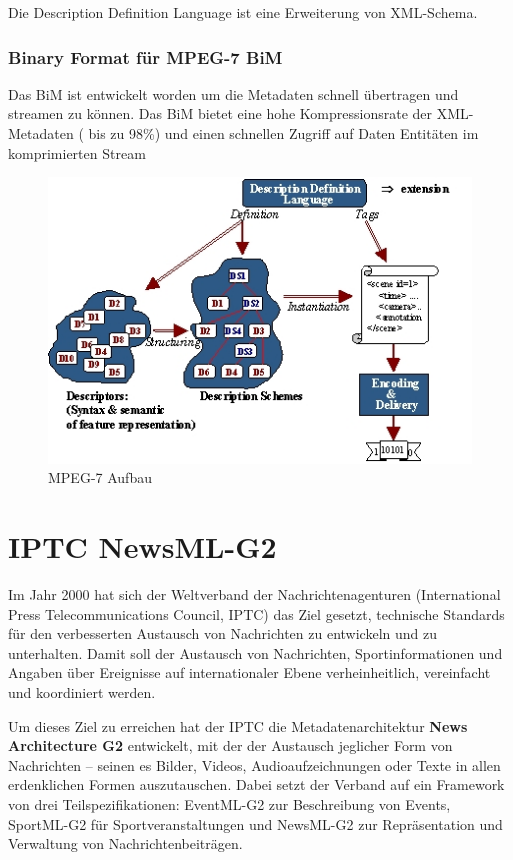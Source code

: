 	Die Description Definition Language ist eine Erweiterung von XML-Schema.

\subsubsection{Binary Format für MPEG-7 BiM}

Das BiM ist entwickelt worden um die Metadaten schnell übertragen und streamen zu können. Das BiM bietet eine hohe Kompressionsrate der XML-Metadaten ( bis zu 98\%) und einen schnellen Zugriff auf Daten Entitäten im komprimierten Stream

\begin{figure}[h]
	\includegraphics [scale=0.55]{image004.jpg}
	\caption {MPEG-7 Aufbau}
\end{figure}

	\section{IPTC NewsML-G2}
	
	Im Jahr 2000 hat sich der Weltverband der Nachrichtenagenturen (International Press Telecommunications Council, IPTC) das Ziel gesetzt, technische Standards für den verbesserten Austausch von Nachrichten zu entwickeln und zu unterhalten. Damit soll der Austausch von Nachrichten, Sportinformationen und Angaben über Ereignisse auf internationaler Ebene verheinheitlich, vereinfacht und koordiniert werden.
	
	Um dieses Ziel zu erreichen hat der IPTC die Metadatenarchitektur \textbf{News Architecture G2} entwickelt, mit der der Austausch jeglicher Form von Nachrichten -- seinen es Bilder, Videos, Audioaufzeichnungen oder Texte in allen erdenklichen Formen auszutauschen. Dabei setzt der Verband auf ein Framework von drei Teilspezifikationen: EventML-G2 zur Beschreibung von Events, SportML-G2 für Sportveranstaltungen und NewsML-G2 zur Repräsentation und Verwaltung von Nachrichtenbeiträgen.
	
